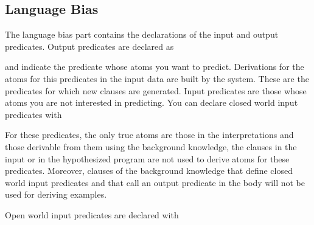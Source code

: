 \documentclass[letterpaper,10pt,english]{sphinxmanual}
\begin{document}
\subsection{Language Bias}
\label{\detokenize{index:language-bias}}
\sphinxAtStartPar
The language bias part contains the declarations of the input and output predicates.
Output predicates are declared as

\begin{sphinxVerbatim}[commandchars=\\\{\}]
\end{sphinxVerbatim}

\sphinxAtStartPar
and indicate the predicate whose atoms you want to predict.
Derivations for the atoms for this predicates in the input data are built by the system.
These are the predicates for which new clauses are generated.
Input predicates are those whose atoms you are not interested in predicting.
You can declare closed world input predicates with

\begin{sphinxVerbatim}[commandchars=\\\{\}]
\end{sphinxVerbatim}

\sphinxAtStartPar
For these predicates, the only true atoms are those in the interpretations and those derivable from them using the background knowledge, the clauses in the input or in the hypothesized program are not used to derive atoms for these predicates. Moreover, clauses of the background knowledge that define closed world input predicates and that call an output predicate in the body will not be used for deriving examples.

\sphinxAtStartPar
Open world input predicates are declared with

\begin{sphinxVerbatim}[commandchars=\\\{\}]
\end{sphinxVerbatim}
\end{document}
